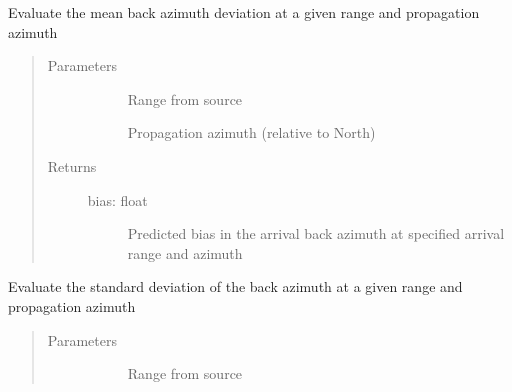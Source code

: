\documentclass[letterpaper,10pt,english]{sphinxmanual}
\begin{document}
\begin{fulllineitems}

\begin{fulllineitems}
\label{\detokenize{stochprop.propagation:stochprop.propagation.PathGeometryModel.eval_az_dev_mn}}
\sphinxAtStartPar
Evaluate the mean back azimuth deviation at a given range
and propagation azimuth
\begin{quote}\begin{description}
\item[{Parameters}] \leavevmode\begin{description}
\item[{}] \leavevmode
\sphinxAtStartPar
Range from source

\item[{}] \leavevmode
\sphinxAtStartPar
Propagation azimuth (relative to North)

\end{description}

\item[{Returns}] \leavevmode\begin{description}
\item[{bias: float}] \leavevmode
\sphinxAtStartPar
Predicted bias in the arrival back azimuth at specified arrival range and azimuth

\end{description}

\end{description}\end{quote}

\end{fulllineitems}


\begin{fulllineitems}
\label{\detokenize{stochprop.propagation:stochprop.propagation.PathGeometryModel.eval_az_dev_std}}
\sphinxAtStartPar
Evaluate the standard deviation of the back azimuth at a given range
and propagation azimuth
\begin{quote}\begin{description}
\item[{Parameters}] \leavevmode\begin{description}
\item[{}] \leavevmode
\sphinxAtStartPar
Range from source


\end{description}
\end{description}
\end{quote}
\end{fulllineitems}
\end{fulllineitems}
\end{document}
